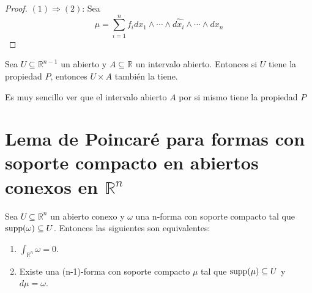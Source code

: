 \documentclass[12pt]{report}
\theoremstyle{largebreak}
\begin{document}
    \begin{proof}
        $(1)\Rightarrow(2)$: Sea
        \begin{equation}
            \mu=\sum_{i=1}^{n}f_i dx_1\wedge\cdots\wedge\hat{dx_i}\wedge\cdots\wedge dx_n
        \end{equation}
    \end{proof}

    \begin{theor}
        Sea $U\subseteq\mathbb{R}^{n-1}$ un abierto y $A\subseteq\mathbb{R}$ un intervalo abierto. Entonces si $U$ tiene la propiedad $P$, entonces $U\times A$ también la tiene.
    \end{theor}

    \begin{obs}
        Es muy sencillo ver que el intervalo abierto $A$ por si mismo tiene la propiedad $P$
    \end{obs}

    \section{Lema de Poincaré para formas con soporte compacto en abiertos conexos en $\mathbb{R}^n$}

    \begin{theor}
        Sea $U\subseteq\mathbb{R}^n$ un abierto conexo y $\omega$ una n-forma con soporte compacto tal que $\textup{supp}(\omega)\subseteq U$. Entonces las siguientes son equivalentes:
        \begin{enumerate}
            \item $\int_{\mathbb{R}^n}\omega = 0$.
            \item Existe una (n-1)-forma con soporte compacto $\mu$ tal que $\textup{supp}(\mu)\subseteq U$ y $d\mu = \omega$.
        \end{enumerate}
    \end{theor}
    
\end{document}
